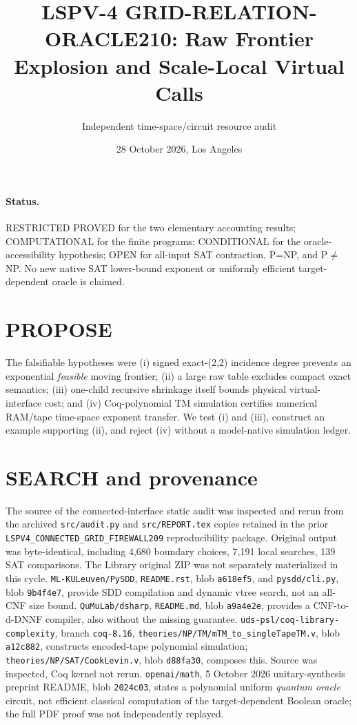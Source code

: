 \documentclass[11pt]{article}
\title{LSPV-4 GRID-RELATION-ORACLE210: Raw Frontier Explosion and Scale-Local Virtual Calls}
\author{Independent time-space/circuit resource audit}
\date{28 October 2026, Los Angeles}
\begin{document}
\maketitle
\paragraph{Status.} RESTRICTED PROVED for the two elementary accounting results; COMPUTATIONAL for the finite programs; CONDITIONAL for the oracle-accessibility hypothesis; OPEN for all-input SAT contraction, P=NP, and P$\ne$NP. No new native SAT lower-bound exponent or uniformly efficient target-dependent oracle is claimed.
\section{PROPOSE}
The falsifiable hypotheses were (i) signed exact-(2,2) incidence degree prevents an exponential \emph{feasible} moving frontier; (ii) a large raw table excludes compact exact semantics; (iii) one-child recursive shrinkage itself bounds physical virtual-interface cost; and (iv) Coq-polynomial TM simulation certifies numerical RAM/tape time-space exponent transfer. We test (i) and (iii), construct an example supporting (ii), and reject (iv) without a model-native simulation ledger.
\section{SEARCH and provenance}
The source of the connected-interface static audit was inspected and rerun from the archived \texttt{src/audit.py} and \texttt{src/REPORT.tex} copies retained in the prior \texttt{LSPV4\_CONNECTED\_GRID\_FIREWALL209} reproducibility package. Original output was byte-identical, including 4,680 boundary choices, 7,191 local searches, 139 SAT comparisons. The Library original ZIP was not separately materialized in this cycle.
\texttt{ML-KULeuven/PySDD}, \texttt{README.rst}, blob \texttt{a618ef5}, and \texttt{pysdd/cli.py}, blob \texttt{9b4f4e7}, provide SDD compilation and dynamic vtree search, not an all-CNF size bound. \texttt{QuMuLab/dsharp}, \texttt{README.md}, blob \texttt{a9a4e2e}, provides a CNF-to-d-DNNF compiler, also without the missing guarantee. \texttt{uds-psl/coq-library-complexity}, branch \texttt{coq-8.16}, \texttt{theories/NP/TM/mTM\_to\_singleTapeTM.v}, blob \texttt{a12c882}, constructs encoded-tape polynomial simulation; \texttt{theories/NP/SAT/CookLevin.v}, blob \texttt{d88fa30}, composes this. Source was inspected, Coq kernel not rerun. \texttt{openai/math}, 5 October 2026 unitary-synthesis preprint README, blob \texttt{2024c03}, states a polynomial uniform \emph{quantum oracle} circuit, not efficient classical computation of the target-dependent Boolean oracle; the full PDF proof was not independently replayed.
\end{document}
